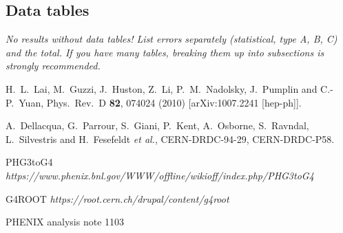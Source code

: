 \documentclass[12pt]{article}
\begin{document}
\subsection{Data tables}

{\it
  No results without data tables!  List errors separately
  (statistical, type A, B, C) and the total.  If you have many tables,
  breaking them up into subsections is strongly recommended.
}


\begin{thebibliography}{9}

  H.~L.~Lai, M.~Guzzi, J.~Huston, Z.~Li, P.~M.~Nadolsky, J.~Pumplin and C.-P.~Yuan,
  Phys.\ Rev.\ D {\bf 82}, 074024 (2010)
  [arXiv:1007.2241 [hep-ph]].


  A.~Dellacqua, G.~Parrour, S.~Giani, P.~Kent, A.~Osborne, S.~Ravndal, L.~Silvestris and H.~Fesefeldt {\it et al.},
  CERN-DRDC-94-29, CERN-DRDC-P58.

 PHG3toG4
   {\it https://www.phenix.bnl.gov/WWW/offline/wikioff/index.php/PHG3toG4 }

 G4ROOT
   {\it https://root.cern.ch/drupal/content/g4root}
   
 PHENIX analysis note 1103


\end{thebibliography}
\end{document}
